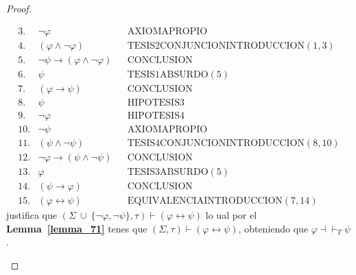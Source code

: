\begin{proof}
\begin{enumerate}[(1)]
\[\begin{array}{llll}
            3. & \lnot \varphi && \text{AXIOMAPROPIO} \\
            4. & (\varphi \wedge \lnot \varphi) && \text{TESIS2CONJUNCIONINTRODUCCION}(1,3) \\
            5. & \lnot \psi \rightarrow (\varphi \wedge \lnot \varphi) && \text{CONCLUSION} \\
            6. & \psi && \text{TESIS1ABSURDO}(5) \\
            7. & (\varphi \rightarrow \psi) && \text{CONCLUSION} \\
            8. & \psi && \text{HIPOTESIS3} \\
            9. & \lnot \varphi && \text{HIPOTESIS4} \\
            10. & \lnot \psi && \text{AXIOMAPROPIO} \\
            11. & (\psi \wedge \lnot \psi) && \text{TESIS4CONJUNCIONINTRODUCCION}(8,10) \\
            12. & \lnot \varphi \rightarrow (\psi \wedge \lnot \psi) && \text{CONCLUSION} \\
            13. & \varphi && \text{TESIS}3\text{ABSURDO}(5) \\
            14. & (\psi \rightarrow \varphi) && \text{CONCLUSION} \\
            15. & (\varphi \leftrightarrow \psi) && \text{EQUIVALENCIAINTRODUCCION}(7,14)
          \end{array}
        \]
       \PN justifica que $(\Sigma \ \cup \ \{\lnot \varphi, \lnot \psi\}, \tau) \vdash (\varphi \leftrightarrow \psi)$
       lo ual por el \textbf{Lemma~\ref{lemma_71}} tenes que $(\Sigma, \tau) \vdash (\varphi \leftrightarrow \psi)$,
       obteniendo que $\varphi \dashv \vdash_{T} \psi$.
    \end{enumerate}
  \end{proof}


